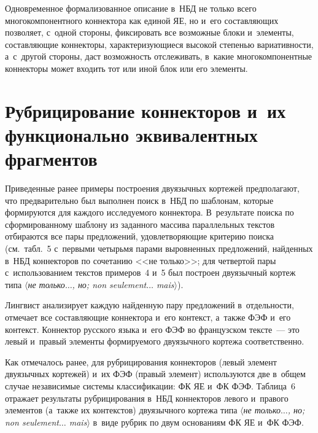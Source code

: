 \begin{multicols}{2}
  Одновременное формализованное описание в~НБД не только всего 
многокомпонентного коннектора как единой ЯЕ, но и~его 
со\-став\-ля\-ющих позволяет, с~одной стороны, фиксировать все возможные 
блоки и~элементы, составляющие коннекторы, характеризующиеся высокой 
сте\-пенью вариативности, а~с~другой стороны, даст возможность 
отслеживать, в~какие многокомпонентные коннекторы может входить тот 
или иной блок или его элементы.

\vspace*{-8pt}

\section{Рубрицирование коннекторов и~их функционально эквивалентных фрагментов}

\vspace*{-2pt}

  Приведенные ранее примеры построения двуязычных кортежей 
предполагают, что предварительно был выполнен поиск в~НБД по шаблонам, 
которые формируются для каждого исследуемого коннектора. В~результате 
поиска по сформированному шаблону из заданного массива параллельных 
текстов отбираются все пары предложений, удовлетворяющие критерию 
поиска (см.\ табл.~5 с~первыми четырьмя парами выровненных 
предложений, найденных в~НБД коннекторов по сочетанию <<не только>>; 
для четвертой пары с~использованием текстов примеров~4 и~5 был построен 
двуязычный кортеж типа $\langle$\textit{не только$\ldots$, но; non 
seulement$\ldots$ mais}$\rangle$).
  

  
  Лингвист анализирует каждую найденную пару предложений 
в~отдельности, отмечает все со\-став\-ля\-ющие коннектора и~его контекст, 
а~также ФЭФ и~его контекст. Коннектор русского языка и~его ФЭФ во 
французском тексте~--- это левый и~правый элементы формируемого 
двуязычного кортежа соответственно.
  
  Как отмечалось ранее, для рубрицирования коннекторов (левый элемент 
двуязычных кортежей) и~их ФЭФ (правый элемент) используются две 
в~общем случае независимые системы классификации: ФК ЯЕ и~ФК ФЭФ. 
Таблица~6 отражает результаты рубрицирования в~НБД коннекторов левого 
и~правого элементов (а~также их контекстов) двуязычного кортежа типа $\langle$\textit{не только$\ldots$, 
но; non seulement$\ldots$ mais}$\rangle$ в~виде рубрик по двум основаниям ФК ЯЕ 
и~ФК ФЭФ.
  
\begin{table*}\small %
\begin{center}
\vspace*{2ex}


\end{center}
\end{table*}
\end{multicols}
